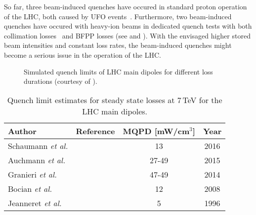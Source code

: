 
So far, three beam-induced quenches have occured in standard proton operation of the LHC, both caused by UFO events~\cite{IPAC16:TUPMW023}. Furthermore, two beam-induced quenches have occured with heavy-ion beams in dedicated quench tests with both collimation losses~\cite{ACC-NOTE-16-0031} and BFPP losses (see  and \cite{accnote_bfpp_quench}). With the envisaged higher stored beam intensities and constant loss rates, the beam-induced quenches might become a serious issue in the operation of the LHC. 

\begin{figure}[t]
  \centering
  \caption{Simulated quench limits of LHC main dipoles for different loss durations (courtesy of \cite{PhysRevSTAB.18.061002}).}  
  \label{pic:16070403}
  \end{figure}


\begin{table}[htbp]
  \centering
  \caption{Quench limit estimates for steady state losses at 7\,TeV for the LHC main dipoles.}
  \label{tab:quenchlim}
  \begin{tabular}{lccc} 
    \toprule
    Author           & Reference & MQPD {[}mW/cm$^{3}${]} & Year \\ \midrule
    Schaumann \textit{et al.} & \cite{accnote_bfpp_quench}  & 13               & 2016 \\
    Auchmann \textit{et al.} & \cite{PhysRevSTAB.18.061002}  & 27-49                  & 2015 \\
    Granieri \textit{et al.} & \cite{IEEE:granieri}          & 47-49                  & 2014 \\
    Bocian \textit{et al.} & \cite{IEEE:bocian}              & 12                     & 2008 \\
    Jeanneret \textit{et al.} & \cite{lhcprojreport44}       & 5                      & 1996 \\ \bottomrule
  \end{tabular}
\end{table}



